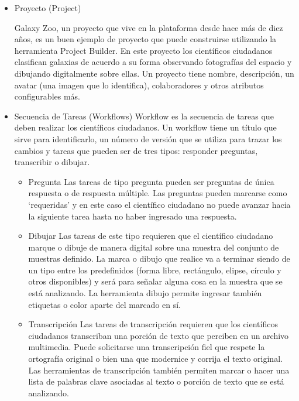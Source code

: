 			\begin{itemize}
				\item { Proyecto (Project) } 
				
				Galaxy Zoo, un proyecto que vive en la plataforma desde hace más de diez años, es un buen ejemplo de proyecto que puede construirse utilizando la herramienta Project Builder. En este proyecto los científicos ciudadanos clasifican galaxias de acuerdo a su forma observando fotografías del espacio y dibujando digitalmente sobre ellas. Un proyecto tiene nombre, descripción, un avatar (una imagen que lo identifica), colaboradores y otros atributos configurables más.
				
				\item { Secuencia de Tareas (Workflows) } 
				Workflow es la secuencia de tareas que deben realizar los científicos ciudadanos. Un workflow tiene un título que sirve para identificarlo, un número de versión que se utiliza para trazar los cambios y tareas que pueden ser de tres tipos:  responder preguntas, transcribir o dibujar.  
				
				\begin{itemize}
				
				\item { Pregunta }  
				Las tareas de tipo pregunta pueden ser preguntas de única respuesta o de respuesta múltiple. Las preguntas pueden marcarse como ‘requeridas’ y en este caso el científico ciudadano no puede avanzar hacia la siguiente tarea hasta no haber ingresado una respuesta.
				
				\item { Dibujar }  
				Las tareas de este tipo requieren que el científico ciudadano marque o dibuje de manera digital sobre una muestra del conjunto de muestras definido. La marca o dibujo que realice va a terminar siendo de un tipo entre los predefinidos (forma libre, rectángulo, elipse, círculo y otros disponibles) y será para señalar alguna cosa en la muestra que se está analizando. La herramienta dibujo permite ingresar también etiquetas o color aparte del marcado en sí.
				
				\item { Transcripción }  
				Las tareas de transcripción requieren que los científicos ciudadanos transcriban una porción de texto que perciben en un archivo multimedia. Puede solicitarse una transcripción fiel que respete la ortografía original o bien una que modernice y corrija el texto original. Las herramientas de transcripción también permiten marcar o hacer una lista de palabras clave asociadas al texto o porción de texto que se está analizando.
				\end{itemize}
				

\end{itemize}
